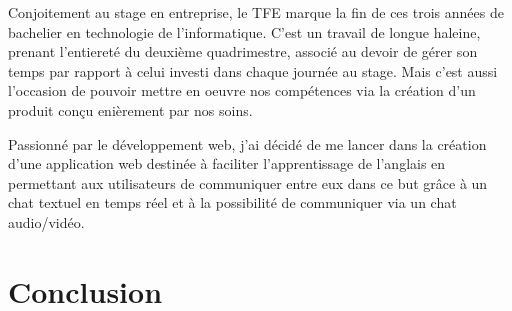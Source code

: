 \documentclass{report}
\begin{document}
  Conjoitement au stage en entreprise, le TFE marque la fin de ces trois années de bachelier en technologie de l'informatique.
  C'est un travail de longue haleine, prenant l'entiereté du deuxième quadrimestre, associé au devoir de gérer son temps par rapport
  à celui investi dans chaque journée au stage.
  Mais c'est aussi l'occasion de pouvoir mettre en oeuvre nos compétences via la création d'un produit conçu enièrement par nos soins.

  Passionné par le développement web, j'ai décidé de me lancer dans la création d'une application web destinée à faciliter l'apprentissage de l'anglais
  en permettant aux utilisateurs de communiquer entre eux dans ce but grâce à un chat textuel en temps réel et à la possibilité de communiquer via un chat
  audio/vidéo.

\chapter{Conclusion}
\end{document}
